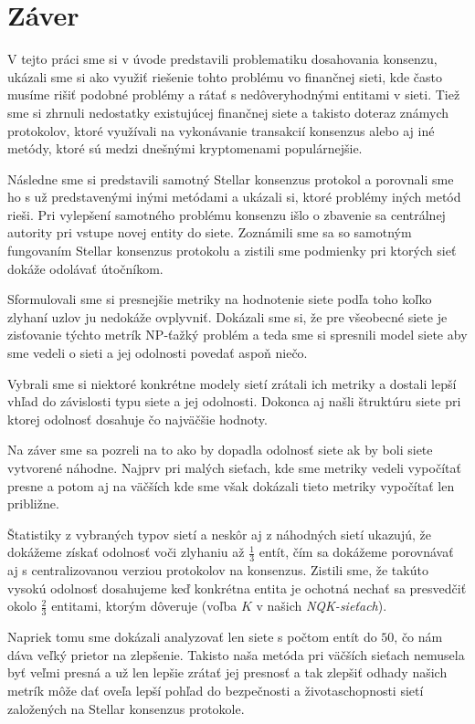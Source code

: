 \chapter*{Záver}  %

V tejto práci sme si v úvode predstavili problematiku dosahovania konsenzu,
ukázali sme si ako využiť riešenie tohto problému vo finančnej sieti, kde
často musíme rišiť podobné problémy a rátať s nedôveryhodnými entitami v sieti.
Tiež sme si zhrnuli nedostatky existujúcej finančnej siete a takisto doteraz
známych protokolov, ktoré využívali na vykonávanie transakcií konsenzus
alebo aj iné metódy, ktoré sú medzi dnešnými kryptomenami populárnejšie.

Následne sme si predstavili samotný Stellar konsenzus protokol a porovnali sme
ho s už predstavenými inými metódami a ukázali si, ktoré problémy iných metód
rieši. Pri vylepšení samotného problému konsenzu išlo o zbavenie sa centrálnej
autority pri vstupe novej entity do siete.
Zoznámili sme sa so samotným fungovaním Stellar konsenzus protokolu a zistili
sme podmienky pri ktorých sieť dokáže odolávať útočníkom.

Sformulovali sme si presnejšie metriky na hodnotenie siete podľa toho koľko
zlyhaní uzlov ju nedokáže ovplyvniť. Dokázali sme si, že pre všeobecné siete
je zisťovanie týchto metrík NP-ťažký problém a teda sme si spresnili model
siete aby sme vedeli o sieti a jej odolnosti povedať aspoň niečo.

Vybrali sme si niektoré konkrétne modely sietí zrátali ich metriky a dostali
lepší vhľad do závislosti typu siete a jej odolnosti. Dokonca aj našli
štruktúru siete pri ktorej odolnosť dosahuje čo najväčšie hodnoty.

Na záver sme sa pozreli na to ako by dopadla odolnosť siete ak by boli siete
vytvorené náhodne. Najprv pri malých sieťach, kde sme metriky vedeli vypočítať
presne a potom aj na väčších kde sme však dokázali tieto metriky vypočítať
len približne.

Štatistiky z vybraných typov sietí a neskôr aj z náhodných sietí ukazujú, že
dokážeme získať odolnosť voči zlyhaniu až $\frac{1}{3}$ entít, čím sa dokážeme
porovnávať aj s centralizovanou verziou protokolov na konsenzus. Zistili sme,
že takúto vysokú odolnosť dosahujeme keď konkrétna entita je ochotná nechať sa
presvedčiť okolo $\frac{2}{3}$ entitami, ktorým dôveruje (voľba $K$ v našich
\textit{NQK-sieťach}).

Napriek tomu sme dokázali analyzovať len siete s počtom entít do $50$, čo
nám dáva veľký prietor na zlepšenie. Takisto naša metóda pri väčších sieťach
nemusela byť veľmi presná a už len lepšie zrátať jej presnosť a tak zlepšiť
odhady našich metrík môže dať oveľa lepší pohľad do bezpečnosti a životaschopnosti
sietí založených na Stellar konsenzus protokole.